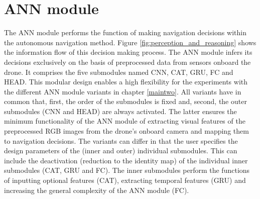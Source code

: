 \section{ANN module}\label{sec:ann_module}
%
%
\newcommand{\R}[1]{\mathbb{R}^{#1}}
\newcommand{\setR}[1]{\left[#1\right]}

\newcommand{\setOfAllPosInts}{\mathbb{N}_{>0}}
\newcommand{\setOfInts}[1]{\left\{ #1 \right\}}
\newcommand{\placeholder}{\square}
\newcommand{\floor}[1]{\left\lfloor #1 \right\rfloor}
\newcommand{\series}[1]{\left(#1\right)}
\newcommand{\tuple}[1]{\left(#1\right)}
%
\newcommand{\rawRGB}{\img[]{\camera}{}{}{}}
\newcommand{\rawRGBFullInt}{\num[]{\camera}{\mxm}{}{}}
\newcommand{\rawRGBHeight}{\num[]{\camera}{\height}{}{}}
\newcommand{\rawRGBWidth}{\num[]{\camera}{\widthh}{}{}}
\newcommand{\rawRGBTimeStep}{\dur[]{\camera}{}{}{}}
\newcommand{\preprocRGB}[1]{\img[]{\preprocessed}{#1}{}{}}
\newcommand{\IMULinAcc}{\acc[\hat]{\imu}{}{\lrs}{}}
\newcommand{\IMUAngVel}{\angvel[\hat]{\imu}{}{\lrs}{}}
\newcommand{\IMUTimeStep}{\dur[]{\imu}{}{}{}}
\newcommand{\optFeatVec}[1]{\featvec[]{\optional}{#1}{}{}}
\newcommand{\CNNMap}{\Func[\user]{\cnn}{}{}{}}
\newcommand{\CNNNumC}{\num[]{\cnn}{\channel}{}{}}
\newcommand{\CNNHeight}{\num[]{\cnn}{\height}{}{}}
\newcommand{\CNNWidth}{\num[]{\cnn}{\widthh}{}{}}
\newcommand{\CNNOutp}{\num[]{\cnn}{\outp}{}{}}
\newcommand{\visFeatVec}[1]{\featvec[]{\visual}{#1}{}{}}
\newcommand{\CNNNumP}{\num[]{\cnn}{\params}{}{}}
\newcommand{\CATMap}{\Func[]{\cat}{}{}{}}
\newcommand{\CATInp}[1]{\num[]{\cat}{#1}{}{}}
\newcommand{\CATNumP}{\num[]{\cat}{\params}{}{}}
%
\newcommand{\batchSize}{\num[\user]{\batch}{}{}{}}
\newcommand{\seqLen}{\num[\user]{\seq}{}{}{}}
\newcommand{\mainFreq}{\freq[\user]{\main}{}{}{}}
\newcommand{\resizeFact}{\anything[\user]{\cnn}{\text{resize}}{}{}{s}}
%
%
The ANN module performs the function of making navigation decisions
within the autonomous navigation method.
Figure \ref{fig:perception_and_reasoning} shows the 
information flow of this decision making process.
The ANN module infers its decisions exclusively 
on the basis of preprocessed data from sensors onboard the drone.
It comprises the five submodules named CNN, CAT, GRU, FC and HEAD.
This modular design enables a high flexibility for the experiments
with the different ANN module variants in chapter \ref{maintwo}.
All variants have in common that,
first, the order of the submodules is fixed
and, second, the outer submodules (CNN and HEAD)
are always activated.
The latter ensures the minimum functionality of the ANN module
of extracting visual features of the preprocessed 
RGB images from the drone's onboard camera
and mapping them to navigation decisions.
The variants can differ in that
the user specifies the design parameters of 
the (inner and outer) individual submodules.
This can include the deactivation (reduction to the identity map)
of the individual inner submodules (CAT, GRU and FC).
The inner submodules perform the functions of
inputting optional features (CAT),
extracting temporal features (GRU)
and increasing the general complexity of the ANN module (FC).

